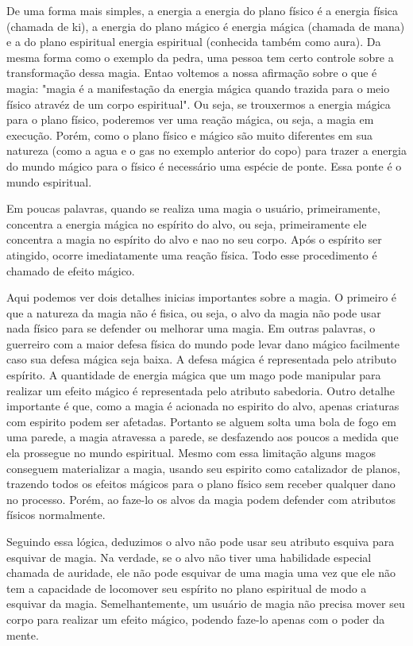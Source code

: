 De uma forma mais simples, a energia a energia do plano físico é a energia física (chamada de ki), a energia do plano mágico é energia mágica (chamada de mana) e a do plano espiritual energia espiritual (conhecida também como aura). Da mesma forma como o exemplo da pedra, uma pessoa tem certo controle sobre a transformação dessa magia. Entao voltemos a nossa afirmação sobre o que é magia: "magia é a manifestação da energia mágica quando trazida para o meio físico atravéz de um corpo espiritual". Ou seja, se trouxermos a energia mágica para o plano físico, poderemos ver uma reação mágica, ou seja, a magia em execução. Porém, como o plano físico e mágico são muito diferentes em sua natureza (como a agua e o gas no exemplo anterior do copo) para trazer a energia do mundo mágico para o físico é necessário uma espécie de ponte. Essa ponte é o mundo espiritual. 

Em poucas palavras, quando se realiza uma magia o usuário, primeiramente, concentra a energia mágica no espírito do alvo, ou seja, primeiramente ele concentra a magia no espírito do alvo e nao no seu corpo. Após o espírito ser atingido, ocorre imediatamente uma reação física. Todo esse procedimento é chamado de efeito mágico.

Aqui podemos ver dois detalhes inicias importantes sobre a magia. O primeiro é que a natureza da magia não é fisica, ou seja, o alvo da magia não pode usar nada físico para se defender ou melhorar uma magia. Em outras palavras, o guerreiro com a maior defesa física do mundo pode levar dano mágico facilmente caso sua defesa mágica seja baixa. A defesa mágica é representada pelo atributo espírito. A quantidade de energia mágica que um mago pode manipular para realizar um efeito mágico é representada pelo atributo sabedoria. Outro detalhe importante é que, como a magia é acionada no espirito do alvo, apenas criaturas com espirito podem ser afetadas. Portanto se alguem solta uma bola de fogo em uma parede, a magia atravessa a parede, se desfazendo aos poucos a medida que ela prossegue no mundo espiritual. Mesmo com essa limitação alguns magos conseguem materializar a magia, usando seu espirito como catalizador de planos, trazendo todos os efeitos mágicos para o plano físico sem receber qualquer dano no processo. Porém, ao faze-lo os alvos da magia podem defender com atributos físicos normalmente. 

Seguindo essa lógica, deduzimos o alvo não pode usar seu atributo esquiva para esquivar de magia. Na verdade, se o alvo não tiver uma habilidade especial chamada de auridade, ele não pode esquivar de uma magia uma vez que ele não tem a capacidade de locomover seu espírito no plano espiritual de modo a esquivar da magia. Semelhantemente, um usuário de magia não precisa mover seu corpo para realizar um efeito mágico, podendo faze-lo apenas com o poder da mente.

